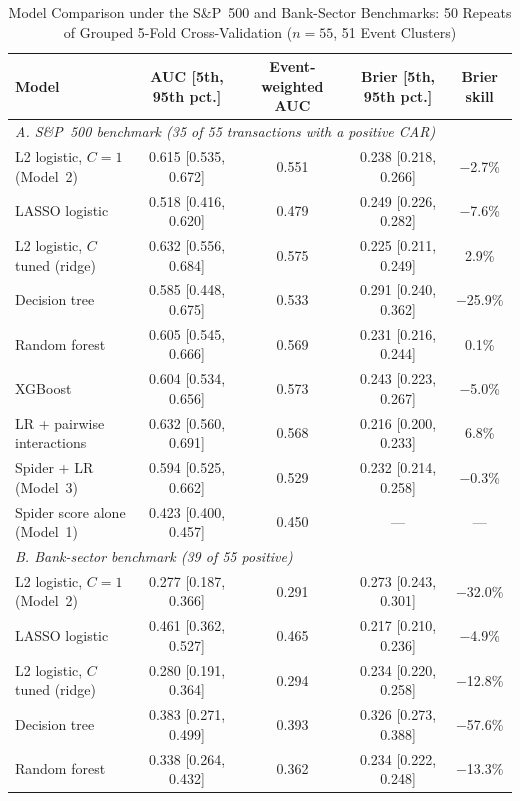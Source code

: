 \begin{table}[!t]
\caption{Model Comparison under the S\&P~500 and Bank-Sector Benchmarks: 50 Repeats of Grouped 5-Fold Cross-Validation ($n=55$, 51 Event Clusters)}
\label{tab:main_results}
\centering
\footnotesize
\begin{tabular*}{\textwidth}{@{\extracolsep{\fill}}lcccc}
\toprule
\textbf{Model} & \textbf{AUC [5th, 95th pct.]} & \textbf{Event-weighted AUC} & \textbf{Brier [5th, 95th pct.]} & \textbf{Brier skill} \\
\midrule
\multicolumn{5}{l}{\textit{A. S\&P~500 benchmark (35 of 55 transactions with a positive CAR)}} \\
L2 logistic, $C=1$ (Model~2) & 0.615 [0.535, 0.672] & 0.551 & 0.238 [0.218, 0.266] & $-$2.7\% \\
LASSO logistic & 0.518 [0.416, 0.620] & 0.479 & 0.249 [0.226, 0.282] & $-$7.6\% \\
L2 logistic, $C$ tuned (ridge) & 0.632 [0.556, 0.684] & 0.575 & 0.225 [0.211, 0.249] & 2.9\% \\
Decision tree & 0.585 [0.448, 0.675] & 0.533 & 0.291 [0.240, 0.362] & $-$25.9\% \\
Random forest & 0.605 [0.545, 0.666] & 0.569 & 0.231 [0.216, 0.244] & 0.1\% \\
XGBoost & 0.604 [0.534, 0.656] & 0.573 & 0.243 [0.223, 0.267] & $-$5.0\% \\
LR + pairwise interactions & 0.632 [0.560, 0.691] & 0.568 & 0.216 [0.200, 0.233] & 6.8\% \\
Spider + LR (Model~3) & 0.594 [0.525, 0.662] & 0.529 & 0.232 [0.214, 0.258] & $-$0.3\% \\
\midrule
Spider score alone (Model~1) & 0.423 [0.400, 0.457] & 0.450 & --- & --- \\
\midrule
\multicolumn{5}{l}{\textit{B. Bank-sector benchmark (39 of 55 positive)}} \\
L2 logistic, $C=1$ (Model~2) & 0.277 [0.187, 0.366] & 0.291 & 0.273 [0.243, 0.301] & $-$32.0\% \\
LASSO logistic & 0.461 [0.362, 0.527] & 0.465 & 0.217 [0.210, 0.236] & $-$4.9\% \\
L2 logistic, $C$ tuned (ridge) & 0.280 [0.191, 0.364] & 0.294 & 0.234 [0.220, 0.258] & $-$12.8\% \\
Decision tree & 0.383 [0.271, 0.499] & 0.393 & 0.326 [0.273, 0.388] & $-$57.6\% \\
Random forest & 0.338 [0.264, 0.432] & 0.362 & 0.234 [0.222, 0.248] & $-$13.3\% \\

\end{tabular*}
\end{table}
